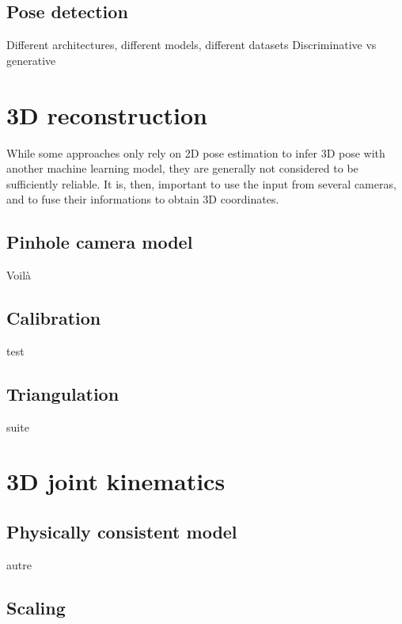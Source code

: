 

\subsection{Pose detection}

Different architectures, different models, different datasets
Discriminative vs generative

\section{3D reconstruction}\label{sec:3D reconstruction}

While some approaches only rely on 2D pose estimation to infer 3D pose with another machine learning model, they are generally not considered to be sufficiently reliable. It is, then, important to use the input from several cameras, and to fuse their informations to obtain 3D coordinates.


\subsection{Pinhole camera model}

Voilà


\subsection{Calibration}

test


\subsection{Triangulation}

suite


\section{3D joint kinematics}

\subsection{Physically consistent model}

autre


\subsection{Scaling}

